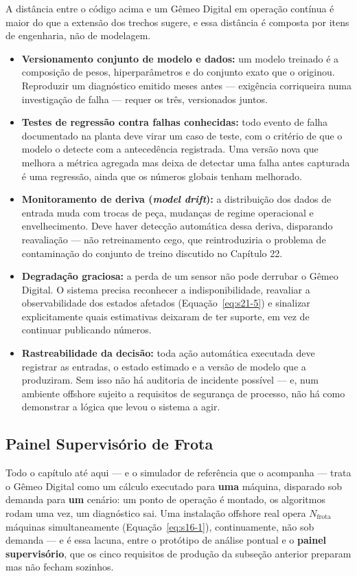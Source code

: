 \documentclass[12pt,a4paper]{article}
\numberwithin{equation}{section}
\numberwithin{table}{section}
\numberwithin{figure}{section}
\begin{document}
{	A distância entre o código acima e um Gêmeo Digital em operação contínua é maior do que a extensão dos trechos sugere, e essa distância é composta por itens de engenharia, não de modelagem.

	\begin{itemize}
		\item \textbf{Versionamento conjunto de modelo e dados:} um modelo treinado é a composição de pesos, hiperparâmetros e do conjunto exato que o originou. Reproduzir um diagnóstico emitido meses antes — exigência corriqueira numa investigação de falha — requer os três, versionados juntos.
		\item \textbf{Testes de regressão contra falhas conhecidas:} todo evento de falha documentado na planta deve virar um caso de teste, com o critério de que o modelo o detecte com a antecedência registrada. Uma versão nova que melhora a métrica agregada mas deixa de detectar uma falha antes capturada é uma regressão, ainda que os números globais tenham melhorado.
		\item \textbf{Monitoramento de deriva (\textit{model drift}):} a distribuição dos dados de entrada muda com trocas de peça, mudanças de regime operacional e envelhecimento. Deve haver detecção automática dessa deriva, disparando reavaliação — não retreinamento cego, que reintroduziria o problema de contaminação do conjunto de treino discutido no Capítulo 22.
		\item \textbf{Degradação graciosa:} a perda de um sensor não pode derrubar o Gêmeo Digital. O sistema precisa reconhecer a indisponibilidade, reavaliar a observabilidade dos estados afetados (Equação~\eqref{eq:s21-5}) e sinalizar explicitamente quais estimativas deixaram de ter suporte, em vez de continuar publicando números.
		\item \textbf{Rastreabilidade da decisão:} toda ação automática executada deve registrar as entradas, o estado estimado e a versão de modelo que a produziram. Sem isso não há auditoria de incidente possível — e, num ambiente offshore sujeito a requisitos de segurança de processo, não há como demonstrar a lógica que levou o sistema a agir.
	\end{itemize}

	\subsection{Painel Supervisório de Frota}

	Todo o capítulo até aqui — e o simulador de referência que o acompanha — trata o Gêmeo Digital como um cálculo executado para \textbf{uma} máquina, disparado sob demanda para \textbf{um} cenário: um ponto de operação é montado, os algoritmos rodam uma vez, um diagnóstico sai. Uma instalação offshore real opera $N_{\text{frota}}$ máquinas simultaneamente (Equação~\eqref{eq:s16-1}), continuamente, não sob demanda — e é essa lacuna, entre o protótipo de análise pontual e o \textbf{painel supervisório}, que os cinco requisitos de produção da subseção anterior preparam mas não fecham sozinhos.

}
\end{document}
